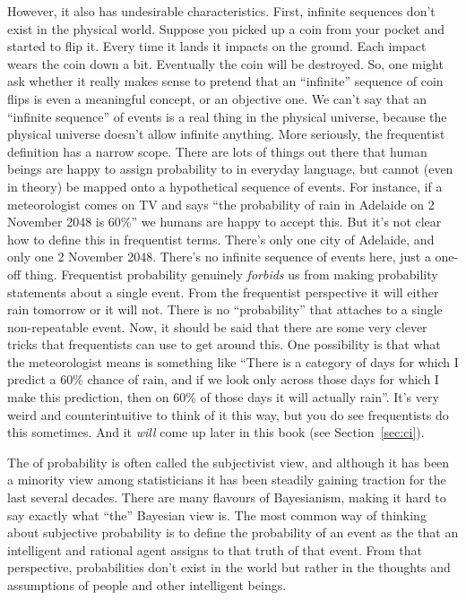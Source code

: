 However, it also has undesirable characteristics. First, infinite sequences don't exist in the physical world. Suppose you picked up a coin from your pocket and started to flip it. Every time it lands it impacts on the ground. Each impact wears the coin down a bit. Eventually the coin will be destroyed. So, one might ask whether it really makes sense to pretend that an ``infinite'' sequence of coin flips is even a meaningful concept, or an objective one. We can't say that an ``infinite sequence'' of events is a real thing in the physical universe, because the physical universe doesn't allow infinite anything.  More seriously, the frequentist definition has a narrow scope. There are lots of things out there that human beings are happy to assign probability to in everyday language, but cannot (even in theory) be mapped onto a hypothetical sequence of events. For instance, if a meteorologist comes on TV and says ``the probability of rain in Adelaide on 2 November 2048 is 60\%'' we humans are happy to accept this. But it's not clear how to define this in frequentist terms. There's only one city of Adelaide, and only one 2 November 2048. There's no infinite sequence of events here, just a one-off thing. Frequentist probability genuinely {\it forbids} us from making probability statements about a single event. From the frequentist perspective it will either rain tomorrow or it will not. There is no ``probability'' that attaches to a single non-repeatable event. Now, it should be said that there are some very clever tricks that frequentists can use to get around this. One possibility is that what the meteorologist means is something like ``There is a category of days for which I predict a 60\% chance of rain, and if we look only across those days for which I make this prediction, then on 60\% of those days it will actually rain''. It's very weird and counterintuitive to think of it this way, but you do see frequentists do this sometimes. And it {\it will} come up later in this book (see Section~\ref{sec:ci}).


The  of probability is often called the subjectivist view, and although it has been a minority view among statisticians it has been steadily gaining traction for the last several decades. There are many flavours of Bayesianism, making it hard to say exactly what ``the'' Bayesian view is. The most common way of thinking about subjective probability is to define the probability of an event as the  that an intelligent and rational agent assigns to that truth of that event. From that perspective, probabilities don't exist in the world but rather in the thoughts and assumptions of people and other intelligent beings.


